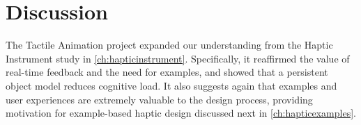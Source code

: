 %
%
%
%
%
%


\section{Discussion}
The Tactile Animation project expanded our understanding from the Haptic Instrument study in \autoref{ch:hapticinstrument}.
Specifically, it reaffirmed the value of real-time feedback and the need for examples, and showed that a persistent object model reduces cognitive load.
It also suggests again that examples and user experiences are extremely valuable to the design process, providing motivation for example-based haptic design discussed next in \autoref{ch:hapticexamples}.




